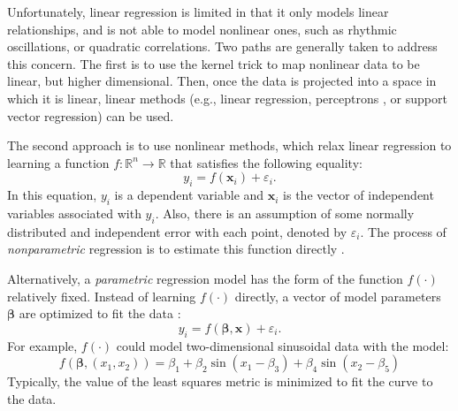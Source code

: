 Unfortunately, linear regression is limited in that it only models linear relationships, and is not able to model nonlinear ones, such as rhythmic oscillations, or quadratic correlations.
Two paths are generally taken to address this concern.
The first is to use the kernel trick \cite{muller2001introduction} to map nonlinear data to be linear, but higher dimensional.
Then, once the data is projected into a space in which it is linear, linear methods (e.g., linear regression, perceptrons \cite{minsky19882perceptrons}, or support vector regression\cite{smola2004tsv}) can be used.

The second approach is to use nonlinear methods, which relax linear regression to learning a function $f: \mathbb{R}^n \rightarrow \mathbb{R}$ that satisfies the following equality:
\[y_i = f(\mathbf x_i) + \varepsilon_i.\]
In this equation, $y_i$ is a dependent variable and $\mathbf x_i$ is the vector of independent variables associated with $y_i$.
Also, there is an assumption of some normally distributed and independent error with each point, denoted by $\varepsilon_i$.
The process of \textit{nonparametric} regression is to estimate this function directly \cite{fox2002r}.

Alternatively, a \textit{parametric} regression model has the form of the function $f(\cdot)$  relatively fixed.
Instead of learning $f(\cdot)$ directly, a vector of model parameters $\mathbf \beta$ are optimized to fit the data \cite{fox2002r}:
\[y_i = f(\mathbf \beta, \mathbf x) + \varepsilon_i.\]
For example, $f(\cdot)$ could model two-dimensional sinusoidal data with the model:
\[f(\mathbf \beta, (x_1, x_2)) = \beta_1 + \beta_2 \sin (x_1 - \beta_3) + \beta_4 \sin (x_2 - \beta_5)\]
Typically, the value of the least squares metric is minimized to fit the curve to the data.

